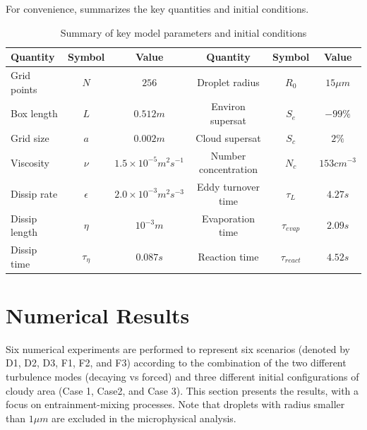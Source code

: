 \documentclass[draft,linenumbers]{agujournal}
\begin{document}
For convenience,  summarizes the key quantities and initial conditions.
\begin{table}
\centering
\caption{Summary of key model parameters and initial conditions}
\label{tb:parameters}
\begin{tabular}{l c c c c c}
\hline
Quantity & Symbol & Value & Quantity & Symbol & Value\\
\hline
Grid points & $N$ & $256$ & Droplet radius & $R_{0}$ & $15\mu m$\\
Box length & $L$ & $0.512m$ & Environ supersat & $S_{e}$ & $-99\%$\\
Grid size & $a$ & $0.002m$ & Cloud supersat & $S_{c}$ & $2\%$\\
Viscosity & $\nu$ & $1.5\times10^{-5}m^{2}s^{-1}$ & Number concentration& $N_{c}$ & $153cm^{-3}$\\
Dissip rate& $\epsilon$ & $2.0\times10^{-3}m^{2}s^{-3}$ & Eddy turnover time & $\tau_{L}$ & $4.27s$\\
Dissip length& $\eta$ & $10^{-3}m$ & Evaporation time & $\tau_{evap}$ & $2.09s$\\
Dissip time& $\tau_{\eta}$ & $0.087s$ & Reaction time & $\tau_{react}$ & $4.52s$\\
\hline
\end{tabular}
\end{table}

\section{Numerical Results}\label{numerical_results}
Six numerical experiments are performed to represent six scenarios (denoted by D1, D2, D3, F1, F2, and F3) according to the combination of the two different turbulence modes (decaying vs forced) and three different initial configurations of cloudy area (Case 1, Case2, and Case 3). This section presents the results, with a focus on entrainment-mixing processes. Note that droplets with radius smaller than $1\mu m$ are excluded in the microphysical analysis. 
\end{document}
